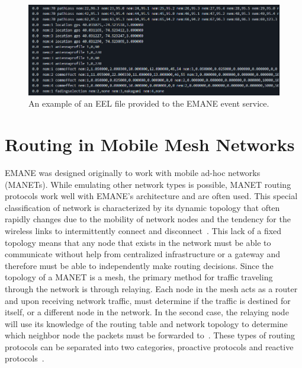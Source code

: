 \begin{figure}[!ht]
    \centering
    \includegraphics[width=\textwidth,keepaspectratio]{Images/Chpt2/emane_event.png}
    \caption{An example of an EEL file provided to the EMANE event service.}
    \label{emane_event}
\end{figure}

\section{Routing in Mobile Mesh Networks}
EMANE was designed originally to work with mobile ad-hoc networks (MANETs).
While emulating other network types is possible, MANET routing protocols work well with EMANE's architecture and are often used.
This special classification of network is characterized by its dynamic topology that often rapidly changes due to the mobility of network nodes and the tendency for the wireless links to intermittently connect and disconnect~\cite{manet_storm}.
This lack of a fixed topology means that any node that exists in the network must be able to communicate without help from centralized infrastructure or a gateway and therefore must be able to independently make routing decisions. 
Since the topology of a MANET is a mesh, the primary method for traffic traveling through the network is through relaying.
Each node in the mesh acts as a router and upon receiving network traffic, must determine if the traffic is destined for itself, or a different node in the network.
In the second case, the relaying node will use its knowledge of the routing table and network topology to determine which neighbor node the packets must be forwarded to~\cite{manet_survey}.
These types of routing protocols can be separated into two categories, proactive protocols and reactive protocols~\cite{manet_survey}.

